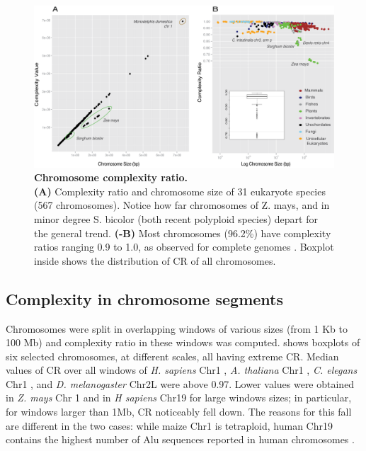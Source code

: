 \begin{figure}[htpb] 
\centering 
\includegraphics[width=\textwidth]{tex_source/figures/dna_struct/chromosome_complexity.png}
\caption[Chromosome complexity ratio]{{\bf Chromosome complexity ratio.} \\\textbf{(A)} Complexity ratio and chromosome size of 31 eukaryote species (567 chromosomes). Notice how far chromosomes of Z. mays, and in minor degree S. bicolor (both recent polyploid species) depart for the general trend. \textbf{(-B)} Most chromosomes (96.2\%) have complexity ratios ranging 0.9 to 1.0, as observed for complete genomes . Boxplot inside shows the distribution of CR of all
chromosomes.}
\label{fig:chr_compl}
\end{figure}

\subsection{Complexity in chromosome segments}
\label{sec:compl-chrom-segm}

Chromosomes were split in overlapping windows of various sizes (from 1 Kb to 100 Mb) and complexity ratio in these windows was computed.  shows boxplots of six selected chromosomes, at different scales, all having extreme CR. Median values of CR over all windows of \textit{H. sapiens} Chr1 , \textit{A. thaliana} Chr1 , \textit{C. elegans} Chr1 , and \textit{D. melanogaster} Chr2L  were above 0.97. Lower values were obtained in \textit{Z. mays} Chr 1  and in \textit{H sapiens} Chr19  for large windows sizes; in particular, for windows larger than 1Mb, CR noticeably fell down. The reasons for this fall are different in the two cases: while maize Chr1 is tetraploid, human Chr19 contains the highest number of Alu sequences reported in human chromosomes \cite{Venter2001}.

